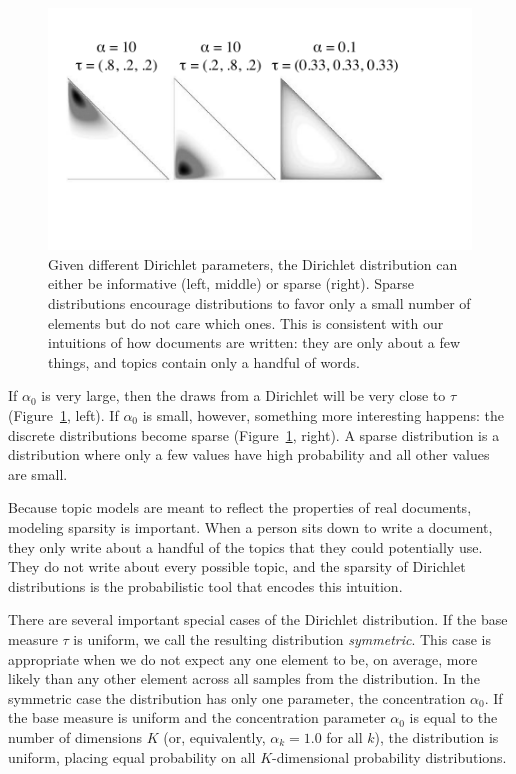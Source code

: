 \begin{center}
\begin{figure}
  \centering
  \includegraphics[width=.8\linewidth]{figures/dirichlet}
  \caption{Given different Dirichlet parameters, the Dirichlet
    distribution can either be informative (left, middle) or sparse
    (right).  Sparse distributions encourage distributions to favor
    only a small number of elements but do not care which ones.  This
    is consistent with our intuitions of how documents are written:
    they are only about a few things, and topics contain only a
    handful of words.}
  \label{fig:dirichlet_sparsity}
\end{figure}
\end{center}


If $\alpha_0$ is very large, then the draws from a Dirichlet will be very close to
$\tau$ (Figure~\ref{fig:dirichlet_sparsity}, left).  If $\alpha_0$ is small, however,
something more interesting happens: the discrete distributions become sparse
(Figure~\ref{fig:dirichlet_sparsity}, right).  A sparse distribution is a
distribution where only a few values have high probability and all other values are small.

Because topic models are meant to reflect the properties of real documents, modeling sparsity is important.  When a person sits down to write a document, they only
write about a handful of the topics that they could potentially use.  They do not write about every possible topic, and the sparsity of Dirichlet distributions is the probabilistic
tool that encodes this intuition.

There are several important special cases of the Dirichlet distribution.
If the base measure $\tau$ is uniform, we call the resulting distribution {\em symmetric}.
This case is appropriate when we do not expect any one element to be, on average, more likely than any other element across all samples from the distribution.
In the symmetric case the  distribution has only one parameter, the concentration $\alpha_0$.
If the base measure is uniform and the concentration parameter $\alpha_0$ is equal to the number of dimensions $K$ (or, equivalently, $\alpha_k = 1.0$ for all $k$), the distribution is uniform, placing equal probability on all $K$-dimensional probability distributions.


